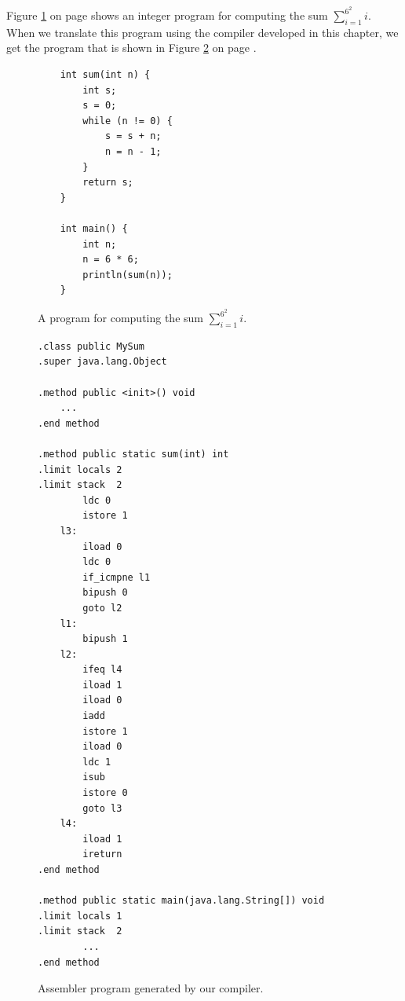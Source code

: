 Figure \ref{fig:MySum.c2} on page \pageref{fig:MySum.c2} shows an integer  program for computing the
sum $\sum\limits_{i=1}^{6^2}i$.  When we translate this program using the compiler developed in this chapter,
we get the program that is shown in Figure \ref{fig:MySum.jas} on page \pageref{fig:MySum.jas}.

\begin{figure}[!ht]
\centering
\begin{verbatim}
    int sum(int n) {
        int s;
        s = 0;
        while (n != 0) {
            s = s + n;
            n = n - 1;
        }
        return s;
    }
    
    int main() {
        int n;
        n = 6 * 6;
        println(sum(n));
    }
\end{verbatim}
\vspace*{-0.3cm}
\caption{A  program for computing the sum $\sum\limits_{i=1}^{6^2}i$.}
\label{fig:MySum.c2}
\end{figure}

\begin{figure}[!ht]
  \centering
\begin{verbatim}
.class public MySum
.super java.lang.Object

.method public <init>() void
    ...
.end method

.method public static sum(int) int
.limit locals 2
.limit stack  2
        ldc 0
        istore 1
    l3:
        iload 0
        ldc 0
        if_icmpne l1
        bipush 0
        goto l2
    l1:
        bipush 1
    l2:
        ifeq l4
        iload 1
        iload 0
        iadd
        istore 1
        iload 0
        ldc 1
        isub
        istore 0
        goto l3
    l4:
        iload 1
        ireturn
.end method

.method public static main(java.lang.String[]) void
.limit locals 1
.limit stack  2
        ...
.end method
\end{verbatim}
\vspace*{-0.3cm}
\caption{Assembler program generated by our compiler.}
\label{fig:MySum.jas}
\end{figure}

